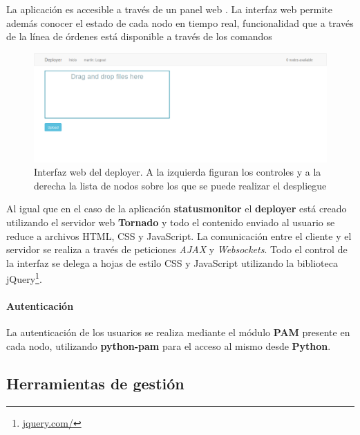 La aplicación es accesible a través de un panel web %
. La interfaz web permite además conocer el estado de cada nodo en tiempo real, funcionalidad que a través de la línea de órdenes está disponible a través de los comandos %

\begin{figure}[H]
\centering
\includegraphics[width=\textwidth]{Chapter3/Figures/deployer}
\caption{Interfaz web del deployer. A la izquierda figuran los controles y a la derecha la lista de nodos sobre los que se puede realizar el despliegue}
\label{fig:vista_deployer}
\end{figure}

Al igual que en el caso de la aplicación \textbf{statusmonitor} el \textbf{deployer} está creado utilizando el servidor web \textbf{Tornado} y todo el contenido enviado al usuario se reduce a archivos HTML, CSS y JavaScript. La comunicación entre el cliente y el servidor se realiza a través de peticiones \textit{AJAX} y \textit{Websockets}. Todo el control de la interfaz se delega a hojas de estilo CSS y JavaScript utilizando la biblioteca jQuery\footnote{\href{https://jquery.com/}{jquery.com/}}.

\paragraph{Autenticación}

La autenticación de los usuarios se realiza mediante el módulo \textbf{PAM} presente en cada nodo\citationneeded{}, utilizando \textbf{python-pam} para el acceso al mismo desde \textbf{Python}\cite{python-am}.


\subsection{Herramientas de gestión}

